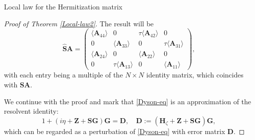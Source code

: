 \documentclass[11pt, a4paper, oneside]{book}
\numberwithin{equation}{chapter}
\newcommand{\beq}{\begin{equation}}
\newcommand{\eeq}{\end{equation}}
\begin{document}
\begin{section}{Local law for the Hermitization matrix}
\begin{proof}[Proof of Theorem \ref{Local-law2}]
The result will be
%
\beq \label{self-energy2}
\bm{\hat{S}} \mathbf{A} = \begin{pmatrix} \langle \mathbf{A}_{44} \rangle & 0& \tau\langle \mathbf{A}_{42} \rangle & 0 \\ 0 & \langle \mathbf{A}_{33}\rangle & 0 & \tau \langle \mathbf{A}_{31} \rangle \\  \langle \mathbf{A}_{24} \rangle & 0 & \langle \mathbf{A}_{22} \rangle & 0\\ 0 & \tau \langle \mathbf{A}_{13} \rangle & 0& \langle \mathbf{A}_{11} \rangle \end{pmatrix},
\eeq
%
with each entry being a multiple of the $N \times N$ identity matrix, which coincides with $\bm{S} \mathbf{A}$.

We continue with the proof and mark that \eqref{Dyson-eq} is an approximation of the resolvent identity:
%
\beq \label{peturb}
1 + ( i\eta + \mathbf{Z} + \bm{S} \mathbf{G} ) \mathbf{G} = \mathbf{D}, \quad \mathbf{D}:= (\mathbf{H}_\zeta +\mathbf{Z} + \bm{S}\mathbf{G}) \mathbf{G} ,
\eeq
%
which can be regarded as a perturbation of \eqref{Dyson-eq} with error matrix $\mathbf{D}$. 


\end{proof}
\end{section}
\end{document}
